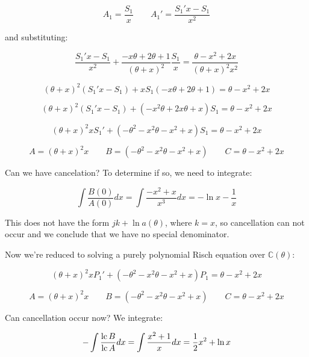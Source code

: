 $$A_1 = \frac{S_1}{x} \qquad A_1' = \frac{S_1' x - S_1}{x^2}$$

and substituting:

$$\frac{S_1' x - S_1}{x^2} + \frac{-x\theta + 2 \theta +1}{(\theta+x)^2} \frac{S_1}{x} = \frac{\theta - x^2 + 2x}{(\theta + x)^2 x^2}$$

$$(\theta+x)^2 (S_1' x - S_1) + x S_1(-x\theta + 2 \theta +1) = \theta - x^2 + 2x$$

$$(\theta+x)^2 (S_1' x - S_1) + (-x^2\theta + 2 x \theta + x) S_1 = \theta - x^2 + 2x$$

$$(\theta+x)^2 x S_1' + (-\theta^2 -x^2\theta - x^2 + x) S_1 = \theta - x^2 + 2x$$

$$A = (\theta+x)^2 x \qquad B = (-\theta^2 -x^2\theta - x^2 + x) \qquad C = \theta - x^2 + 2x$$

Can we have cancelation?  To determine if so, we need to integrate:

$$\int \frac{B(0)}{A(0)} dx = \int \frac{-x^2+x}{x^3} dx = - \ln x - \frac{1}{x}$$

This does not have the form $jk + \ln a(\theta)$, where $k=x$, so cancellation
can not occur and we conclude that we have no special denominator.

Now we're reduced to solving a purely polynomial Risch equation over ${\mathbb C}(\theta)$:

$$(\theta+x)^2 x P_1' + (-\theta^2 -x^2\theta - x^2 + x) P_1 = \theta - x^2 + 2x$$

$$A = (\theta+x)^2 x \qquad B = (-\theta^2 -x^2\theta - x^2 + x) \qquad C = \theta - x^2 + 2x$$

Can cancellation occur now?  We integrate:

$$- \int \frac{{\rm lc}\,B}{{\rm lc}\,A} dx = \int \frac{x^2+1}{x} dx = \frac{1}{2}x^2 + \ln x$$



\endexample

